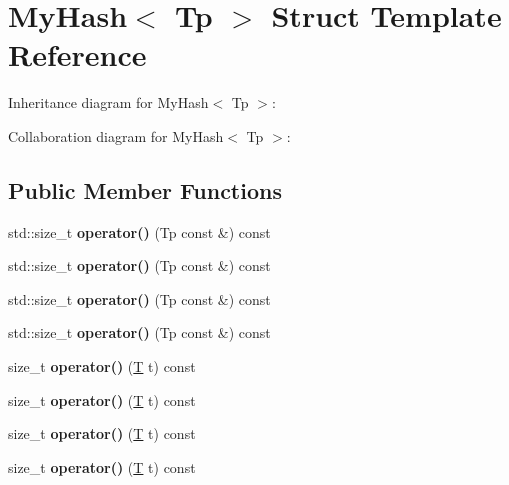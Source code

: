 \hypertarget{struct_my_hash}{}\section{My\+Hash$<$ Tp $>$ Struct Template Reference}
\label{struct_my_hash}


Inheritance diagram for My\+Hash$<$ Tp $>$\+:


Collaboration diagram for My\+Hash$<$ Tp $>$\+:
\subsection*{Public Member Functions}
\begin{DoxyCompactItemize}
\item 
\mbox{\label{struct_my_hash_a88c1814e9de92604c42a8040829c8ae8}} 
std\+::size\+\_\+t {\bfseries operator()} (Tp const \&) const
\item 
\mbox{\label{struct_my_hash_a88c1814e9de92604c42a8040829c8ae8}} 
std\+::size\+\_\+t {\bfseries operator()} (Tp const \&) const
\item 
\mbox{\label{struct_my_hash_a88c1814e9de92604c42a8040829c8ae8}} 
std\+::size\+\_\+t {\bfseries operator()} (Tp const \&) const
\item 
\mbox{\label{struct_my_hash_a88c1814e9de92604c42a8040829c8ae8}} 
std\+::size\+\_\+t {\bfseries operator()} (Tp const \&) const
\item 
\mbox{\label{struct_my_hash_aa17d1722274f3a1f97f9c36f7cdfc4db}} 
size\+\_\+t {\bfseries operator()} (\mbox{\hyperlink{struct_t}{T}} t) const
\item 
\mbox{\label{struct_my_hash_aa17d1722274f3a1f97f9c36f7cdfc4db}} 
size\+\_\+t {\bfseries operator()} (\mbox{\hyperlink{struct_t}{T}} t) const
\item 
\mbox{\label{struct_my_hash_aa17d1722274f3a1f97f9c36f7cdfc4db}} 
size\+\_\+t {\bfseries operator()} (\mbox{\hyperlink{struct_t}{T}} t) const
\item 
\mbox{\label{struct_my_hash_aa17d1722274f3a1f97f9c36f7cdfc4db}} 
size\+\_\+t {\bfseries operator()} (\mbox{\hyperlink{struct_t}{T}} t) const
\end{DoxyCompactItemize}


